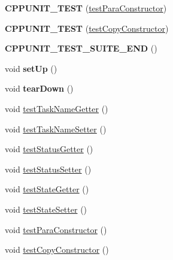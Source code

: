 \begin{DoxyCompactItemize}
\item 
\hypertarget{classFixtureTask_a0b9535a87a3311a4cede7f925a9b0005}{{\bfseries C\-P\-P\-U\-N\-I\-T\-\_\-\-T\-E\-S\-T} (\hyperlink{classFixtureTask_ab02c2f1ac774c37fbaf8bf01a95d765f}{test\-Para\-Constructor})}\label{classFixtureTask_a0b9535a87a3311a4cede7f925a9b0005}

\item 
\hypertarget{classFixtureTask_a4cd66ea3ae59eea1e79fe21e68bc55e2}{{\bfseries C\-P\-P\-U\-N\-I\-T\-\_\-\-T\-E\-S\-T} (\hyperlink{classFixtureTask_a1cdcb138e1c95b84d03959310064c401}{test\-Copy\-Constructor})}\label{classFixtureTask_a4cd66ea3ae59eea1e79fe21e68bc55e2}

\item 
\hypertarget{classFixtureTask_ae952ff2105ae208a4f346a2e1f3f88f8}{{\bfseries C\-P\-P\-U\-N\-I\-T\-\_\-\-T\-E\-S\-T\-\_\-\-S\-U\-I\-T\-E\-\_\-\-E\-N\-D} ()}\label{classFixtureTask_ae952ff2105ae208a4f346a2e1f3f88f8}

\item 
\hypertarget{classFixtureTask_a6842ba348d475991610fc4988d5013f8}{void {\bfseries set\-Up} ()}\label{classFixtureTask_a6842ba348d475991610fc4988d5013f8}

\item 
\hypertarget{classFixtureTask_ae595b1036bfc302569e7b7359eba64af}{void {\bfseries tear\-Down} ()}\label{classFixtureTask_ae595b1036bfc302569e7b7359eba64af}

\item 
void \hyperlink{classFixtureTask_aa6c4e049025fb8fec20e3e4f01f11af9}{test\-Task\-Name\-Getter} ()
\item 
void \hyperlink{classFixtureTask_a7ca68394afb06b5ed6ee577bf41b97d5}{test\-Task\-Name\-Setter} ()
\item 
void \hyperlink{classFixtureTask_ab1f178b4ebcd6d2f81896e3bbda6e40b}{test\-Status\-Getter} ()
\item 
void \hyperlink{classFixtureTask_a6f293436620532dbeb744b4a1e49710e}{test\-Status\-Setter} ()
\item 
void \hyperlink{classFixtureTask_aef7e5a1e9e70606248de77b6aa5dcdc7}{test\-State\-Getter} ()
\item 
void \hyperlink{classFixtureTask_a0a1655fc0353b5aaa147f16724c17e46}{test\-State\-Setter} ()
\item 
void \hyperlink{classFixtureTask_ab02c2f1ac774c37fbaf8bf01a95d765f}{test\-Para\-Constructor} ()
\item 
void \hyperlink{classFixtureTask_a1cdcb138e1c95b84d03959310064c401}{test\-Copy\-Constructor} ()
\end{DoxyCompactItemize}
